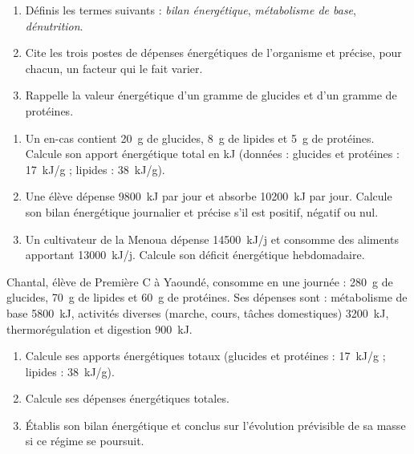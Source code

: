 \documentclass[11pt]{article}
\newcounter{popsec}
\newcounter{popsub}
\newcommand{\courssub}[1]{%
  \stepcounter{popsub}%
  \par\vspace{9pt}\noindent{\popxbold\fontsize{11.5}{13}\selectfont\color{popink}{\color{poporange}\thepopsec.\thepopsub}\hspace{6pt}#1}\par\nopagebreak\vspace{4pt}
}
\begin{document}
\begin{exercice}
\begin{enumerate}
\item Définis les termes suivants : \emph{bilan énergétique}, \emph{métabolisme de base}, \emph{dénutrition}.
\item Cite les trois postes de dépenses énergétiques de l'organisme et précise, pour chacun, un facteur qui le fait varier.
\item Rappelle la valeur énergétique d'un gramme de glucides et d'un gramme de protéines.
\end{enumerate}
\end{exercice}

\begin{exercice}
\begin{enumerate}
\item Un en-cas contient \SI{20}{g} de glucides, \SI{8}{g} de lipides et \SI{5}{g} de protéines. Calcule son apport énergétique total en kJ (données : glucides et protéines : \SI{17}{kJ/g} ; lipides : \SI{38}{kJ/g}).
\item Une élève dépense \SI{9800}{kJ} par jour et absorbe \SI{10200}{kJ} par jour. Calcule son bilan énergétique journalier et précise s'il est positif, négatif ou nul.
\item Un cultivateur de la Menoua dépense \SI{14500}{kJ/j} et consomme des aliments apportant \SI{13000}{kJ/j}. Calcule son déficit énergétique hebdomadaire.
\end{enumerate}
\end{exercice}

\courssub{Je m'entraîne}

\begin{exercice}
Chantal, élève de Première C à Yaoundé, consomme en une journée : \SI{280}{g} de glucides, \SI{70}{g} de lipides et \SI{60}{g} de protéines. Ses dépenses sont : métabolisme de base \SI{5800}{kJ}, activités diverses (marche, cours, tâches domestiques) \SI{3200}{kJ}, thermorégulation et digestion \SI{900}{kJ}.
\begin{enumerate}
\item Calcule ses apports énergétiques totaux (glucides et protéines : \SI{17}{kJ/g} ; lipides : \SI{38}{kJ/g}).
\item Calcule ses dépenses énergétiques totales.
\item Établis son bilan énergétique et conclus sur l'évolution prévisible de sa masse si ce régime se poursuit.
\end{enumerate}
\end{exercice}
\end{document}
